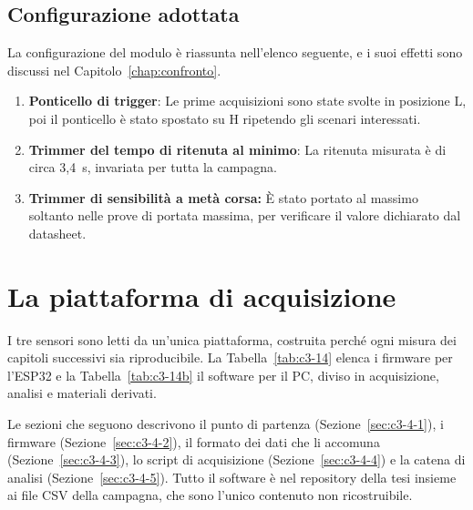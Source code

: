 \subsection{Configurazione adottata}
\label{sec:c3-3-3}

La configurazione del modulo è riassunta nell'elenco seguente, e i suoi effetti sono discussi nel Capitolo~\ref{chap:confronto}.

\begin{enumerate}
  \item \textbf{Ponticello di trigger}: Le prime acquisizioni sono state svolte in posizione L, poi il ponticello è stato spostato su H ripetendo gli scenari interessati.
  \item \textbf{Trimmer del tempo di ritenuta al minimo}: La ritenuta misurata è di circa 3,4~s, invariata per tutta la campagna.
  \item \textbf{Trimmer di sensibilità a metà corsa:} È stato portato al massimo soltanto nelle prove di portata massima, per verificare il valore dichiarato dal datasheet.
\end{enumerate}

\FloatBarrier
\section{La piattaforma di acquisizione}
\label{sec:c3-4}

I tre sensori sono letti da un'unica piattaforma, costruita perché ogni misura dei capitoli successivi sia riproducibile. La Tabella~\ref{tab:c3-14} elenca i firmware per l'ESP32 e la Tabella~\ref{tab:c3-14b} il software per il PC, diviso in acquisizione, analisi e materiali derivati.

Le sezioni che seguono descrivono il punto di partenza (Sezione~\ref{sec:c3-4-1}), i firmware (Sezione~\ref{sec:c3-4-2}), il formato dei dati che li accomuna (Sezione~\ref{sec:c3-4-3}), lo script di acquisizione (Sezione~\ref{sec:c3-4-4}) e la catena di analisi (Sezione~\ref{sec:c3-4-5}). Tutto il software è nel repository della tesi insieme ai file CSV della campagna, che sono l'unico contenuto non ricostruibile.

